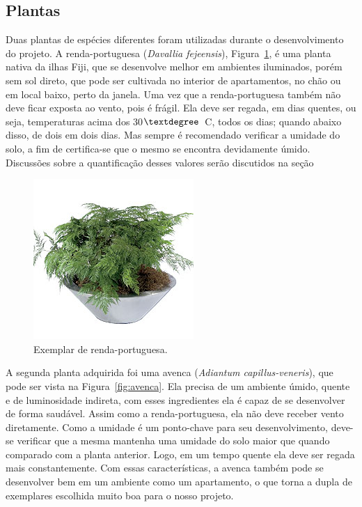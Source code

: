 \documentclass[a4paper,12pt]{report}
\begin{document}
	\subsection{Plantas}
	Duas plantas de espécies diferentes foram utilizadas durante o desenvolvimento do projeto. A renda-portuguesa (\textit{Davallia fejeensis}), Figura~\ref{fig:renda}, é uma planta nativa da ilhas Fiji, que se desenvolve melhor em ambientes iluminados, porém sem sol direto, que pode ser cultivada no interior de apartamentos, no chão ou em local baixo, perto da janela. Uma vez que a renda-portuguesa também não deve ficar exposta ao vento, pois é frágil. Ela deve ser regada, em dias quentes, ou seja, temperaturas acima dos 30$\textdegree$~C, todos os dias; quando abaixo disso, de dois em dois dias. Mas sempre é recomendado verificar a umidade do solo, a fim de certifica-se que o mesmo se encontra devidamente úmido. Discussões sobre a quantificação desses valores serão discutidos na seção %
		
\begin{figure}[!h]
	\centering
	\includegraphics[width=0.4\linewidth]{figs/renda}
	\caption{Exemplar de renda-portuguesa.}
	\label{fig:renda}
\end{figure}

	A segunda planta adquirida foi uma avenca (\textit{Adiantum capillus-veneris}), que pode ser vista na Figura~\ref{fig:avenca}. Ela precisa de um ambiente úmido, quente e de luminosidade indireta, com esses ingredientes ela é capaz de se desenvolver de forma saudável. Assim como a renda-portuguesa, ela não deve receber vento diretamente. Como a umidade é um ponto-chave para seu desenvolvimento, deve-se verificar que a mesma mantenha uma umidade do solo maior que quando comparado com a planta anterior. Logo, em um tempo quente ela deve ser regada mais constantemente. Com essas características, a avenca também pode se desenvolver bem em um ambiente como um apartamento, o que torna a dupla de exemplares escolhida muito boa para o nosso projeto. 
	
\end{document}
